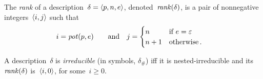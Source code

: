 
\begin{definition}
  \label{def.rank}
  The \emph{rank} of a description~$\delta=\<p,n,e>$,
  denoted~$\operatorname{\mathit{rank}}(\delta)$, is a pair of nonnegative integers~$\<i,j>$ such
  that
  \begin{alignat*}{2}
    i&=\operatorname{\mathit{pot}}(p,e) &\quad\text{and}\quad
    j&=
       \begin{cases}
         n  &\text{if~$e=\varepsilon$}\\
         n+1&\text{otherwise\,.}
       \end{cases}
  \end{alignat*}
\end{definition}


\begin{definition}
  \label{def.H}
  A description~$\delta$ is \emph{irreducible} (in symbols, $\delta_\#$) iff
  it is nested-irreducible and its~$\operatorname{\mathit{rank}}(\delta)$ is~$\<i,0>$, for
  some~$i\ge0$.
\end{definition}

